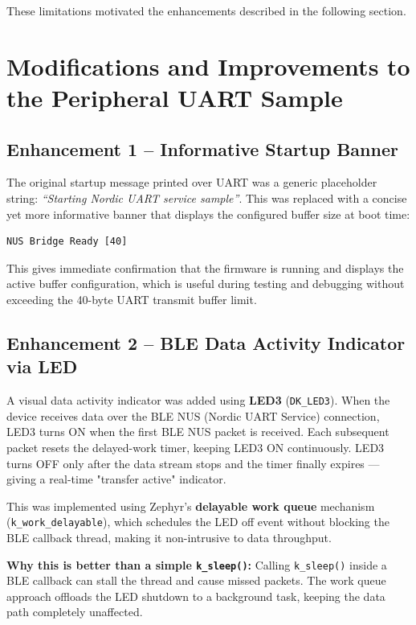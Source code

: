 \documentclass[conference]{IEEEtran}
\begin{document}
\noindent These limitations motivated the enhancements described in the 
following section.

\section{Modifications and Improvements to the Peripheral UART Sample}

\subsection{Enhancement 1 -- Informative Startup Banner}

The original startup message printed over UART was a generic placeholder string: 
\textit{``Starting Nordic UART service sample''}. This was replaced with a concise 
yet more informative banner that displays the configured buffer size at boot time:

\begin{verbatim}
NUS Bridge Ready [40]
\end{verbatim}

\noindent
This gives immediate confirmation that the firmware is running and displays the 
active buffer configuration, which is useful during testing and debugging without 
exceeding the 40-byte UART transmit buffer limit.

\subsection{Enhancement 2 -- BLE Data Activity Indicator via LED}

A visual data activity indicator was added using \textbf{LED3} (\texttt{DK\_LED3}). 
When the device receives data over the BLE NUS (Nordic UART Service) connection, 
LED3 turns ON when the first BLE NUS packet is received. Each subsequent packet resets the delayed-work timer, keeping LED3 ON continuously. LED3 turns OFF only after the data stream stops and the timer finally expires — giving a real-time "transfer active" indicator.

\noindent
This was implemented using Zephyr's \textbf{delayable work queue} mechanism 
(\texttt{k\_work\_delayable}), which schedules the LED off event without blocking 
the BLE callback thread, making it non-intrusive to data throughput.

\noindent
\textbf{Why this is better than a simple \texttt{k\_sleep()}:} Calling 
\texttt{k\_sleep()} inside a BLE callback can stall the thread and cause missed 
packets. The work queue approach offloads the LED shutdown to a background task, 
keeping the data path completely unaffected.
\end{document}
